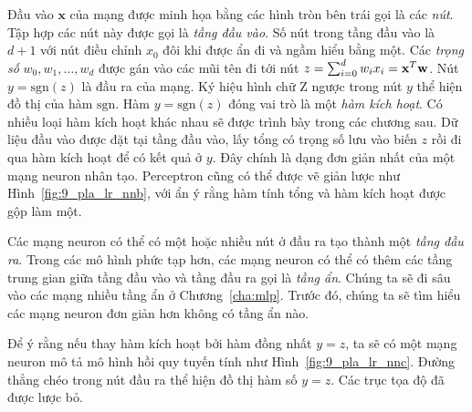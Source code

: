 Đầu vào $\mathbf{x}$ của mạng được minh họa bằng các hình tròn bên trái gọi là
các \textit{nút}. Tập hợp các nút này được gọi là \textit{tầng đầu vào}. Số nút
trong tầng đầu vào là $d + 1$ với nút điều chỉnh $x_0$ đôi khi được ẩn đi và ngầm hiểu  bằng một. Các \textit{trọng số} $w_0, w_1, \dots, w_d$ được gán vào các mũi
tên đi tới nút $ z = \sum_{i=0}^dw_ix_i =
\mathbf{x}^T\mathbf{w}$. Nút $y = \text{sgn}(z)$ là đầu ra của
mạng. Ký hiệu hình chữ Z ngược trong nút $y$ thể hiện đồ thị của hàm
$\text{sgn}$. Hàm $y = \text{sgn}(z)$ đóng vai trò là một \textit{hàm kích
hoạt}. Có nhiều loại hàm kích hoạt khác nhau sẽ được trình bày trong các chương sau. Dữ liệu đầu vào được đặt tại tầng đầu vào, lấy tổng có trọng số lưu vào
biến $z$ rồi đi qua hàm kích hoạt để có kết quả ở $y$. Đây chính là dạng đơn
giản nhất của một mạng neuron nhân tạo. Perceptron cũng có thể được vẽ giản lược
như Hình~\ref{fig:9_pla_lr_nnb}, với ẩn ý rằng hàm tính tổng và hàm kích hoạt
được gộp làm một.

Các mạng neuron có thể có một hoặc nhiều nút ở đầu ra tạo thành một \textit{tầng
đầu ra}. Trong các mô hình phức tạp hơn, các mạng neuron có thể có thêm các tầng
trung gian giữa tầng đầu vào và tầng đầu ra gọi là \textit{tầng ẩn}. Chúng
ta sẽ đi sâu vào các mạng nhiều tầng ẩn ở Chương~\ref{cha:mlp}. Trước đó, chúng
ta sẽ tìm hiểu các mạng neuron đơn giản hơn không có tầng ẩn nào.


Để ý rằng nếu thay hàm kích hoạt bởi hàm đồng nhất $y = z$, ta sẽ có một mạng neuron mô tả mô hình hồi quy tuyến tính như Hình~\ref{fig:9_pla_lr_nnc}.
Đường thẳng chéo trong nút đầu ra thể hiện đồ thị hàm số $y = z$. Các trục tọa độ đã
được lược bỏ.



